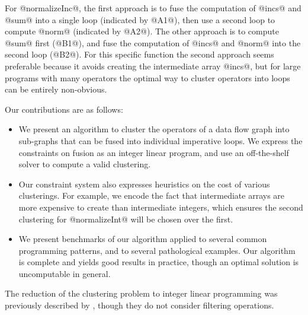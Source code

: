 For @normalizeInc@, the first approach is to fuse the computation of @incs@ and @sum@ into a single loop (indicated by @A1@), then use a second loop to compute @norm@ (indicated by @A2@). The other approach is to compute @sum@ first (@B1@), and fuse the computation of @incs@ and @norm@ into the second loop (@B2@). For this specific function the second approach seems preferable because it avoids creating the intermediate array @incs@, but for large programs with many operators the optimal way to cluster operators into loops can be entirely non-obvious. 

Our contributions are as follows:

\begin{itemize}
\item   We present an algorithm to cluster the operators of a data flow graph into sub-graphs that can be fused into individual imperative loops. We express the constraints on fusion as an integer linear program, and use an off-the-shelf solver to compute a valid clustering. 

\item   Our constraint system also expresses heuristics on the cost of various clusterings. For example, we encode the fact that intermediate arrays are more expensive to create than intermediate integers, which ensures the second clustering for @normalizeInt@ will be chosen over the first. 

\item   We present benchmarks of our algorithm applied to several common programming patterns, and to several pathological examples. Our algorithm is complete and yields good results in practice, though an optimal solution is uncomputable in general. 
\end{itemize}

The reduction of the clustering problem to integer linear programming was previously described by \cite{megiddo1998optimal}, though they do not consider filtering operations.




